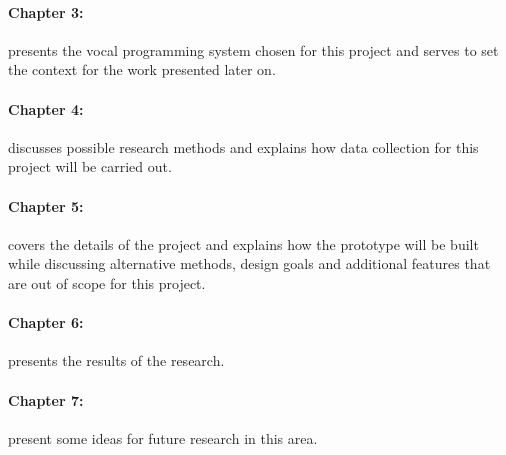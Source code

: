 \documentclass[../thesis.tex]{subfiles}
\begin{document}
\paragraph{Chapter 3: } presents the vocal programming system chosen for this project
and serves to set the context for the work presented later on.
\paragraph{Chapter 4: } discusses possible research methods and explains
how data collection for this project will be carried out.
\paragraph{Chapter 5: } covers the details of the project and explains
how the prototype will be built while discussing alternative methods, design goals
and additional features that are out of scope for this project.
\paragraph{Chapter 6: } presents the results of the research.
\paragraph{Chapter 7: } present some ideas for future research in this area.
\end{document}
